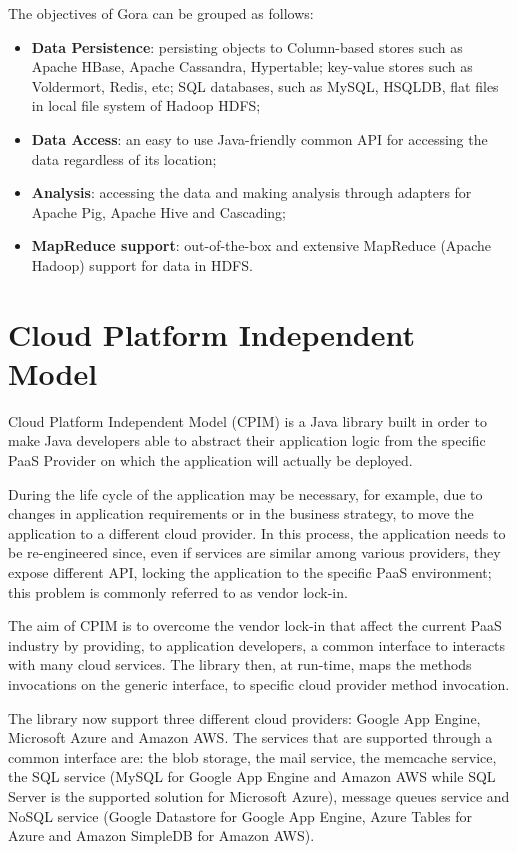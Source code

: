 \newparagraph The objectives of Gora can be grouped as follows:
\begin{itemize}
\item \textbf{Data Persistence}: persisting objects to Column-based stores such as Apache HBase, Apache Cassandra, Hypertable; key-value stores such as Voldermort, Redis, etc; SQL databases, such as MySQL, HSQLDB, flat files in local file system of Hadoop HDFS; 
\item \textbf{Data Access}: an easy to use Java-friendly common API for accessing the data regardless of its location; 
\item \textbf{Analysis}: accessing the data and making analysis through adapters for Apache Pig, Apache Hive and Cascading;
\item \textbf{MapReduce support}: out-of-the-box and extensive MapReduce (Apache Hadoop) support for data in HDFS.
\end{itemize}

\section{Cloud Platform Independent Model}
\label{sec:cpim}
Cloud Platform Independent Model (CPIM) \cite{thesis:cpim} is a Java library built in order to make Java developers able to abstract their application logic from the specific PaaS Provider on which the application will actually be deployed.

\noindent During the life cycle of the application may be necessary, for example, due to changes in application requirements or in the business strategy, to move the application to a different cloud provider.
In this process, the application needs to be re-engineered since, even if services are similar among various providers, they expose different API, locking the application to the specific PaaS environment; this problem is commonly referred to as vendor lock-in.

\noindent The aim of CPIM is to overcome the vendor lock-in that affect the current PaaS industry by providing, to application developers, a common interface to interacts with many cloud services. The library then, at run-time, maps the methods invocations on the generic interface, to specific cloud provider method invocation.

\noindent The library now support three different cloud providers: Google App Engine, Microsoft Azure and Amazon AWS.
The services that are supported through a common interface are: the blob storage, the mail service, the memcache service, the SQL service (MySQL for Google App Engine and Amazon AWS while SQL Server is the supported solution  for Microsoft Azure), message queues service and NoSQL service (Google Datastore for Google App Engine, Azure Tables for Azure and Amazon SimpleDB for Amazon AWS).

